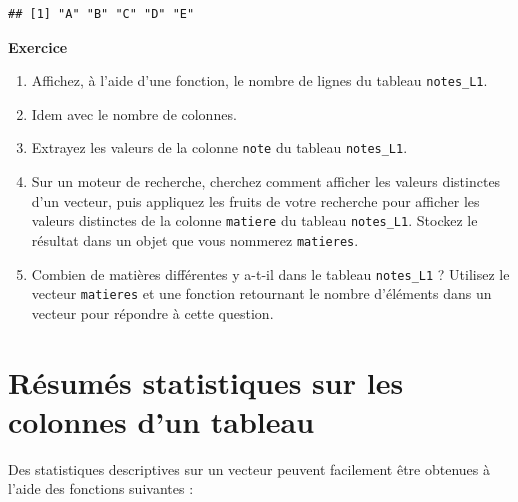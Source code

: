 \documentclass[
  11pt,
]{book}
\newcommand{\VERB}{\Verb[commandchars=\\\{\}]}
\newcommand{\FunctionTok}[1]{\textcolor[rgb]{0.00,0.00,0.00}{#1}}
\newcommand{\NormalTok}[1]{#1}
\providecommand{\tightlist}{%
  \setlength{\itemsep}{0pt}\setlength{\parskip}{0pt}}
\numberwithin{equation}{section}
\numberwithin{countremarque}{section}
\newenvironment{greenbox}{
  \begin{tcolorbox}[breakable, colback=vert,coltext=black,
                  colframe=grisfonce]}
 {\end{tcolorbox}}
\begin{document}
\begin{lstlisting}
## [1] "A" "B" "C" "D" "E"
\end{lstlisting}

\begin{greenbox}

\textbf{Exercice}

\begin{enumerate}
\def\labelenumi{\arabic{enumi}.}
\tightlist
\item
  Affichez, à l'aide d'une fonction, le nombre de lignes du tableau \texttt{notes\_L1}.
\item
  Idem avec le nombre de colonnes.
\item
  Extrayez les valeurs de la colonne \texttt{note} du tableau \texttt{notes\_L1}.
\item
  Sur un moteur de recherche, cherchez comment afficher les valeurs distinctes d'un vecteur, puis appliquez les fruits de votre recherche pour afficher les valeurs distinctes de la colonne \texttt{matiere} du tableau \texttt{notes\_L1}. Stockez le résultat dans un objet que vous nommerez \texttt{matieres}.
\item
  Combien de matières différentes y a-t-il dans le tableau \texttt{notes\_L1} ? Utilisez le vecteur \texttt{matieres} et une fonction retournant le nombre d'éléments dans un vecteur pour répondre à cette question.
\end{enumerate}

\end{greenbox}

\hypertarget{ruxe9sumuxe9s-statistiques-sur-les-colonnes-dun-tableau}{%
\section{Résumés statistiques sur les colonnes d'un tableau}\label{ruxe9sumuxe9s-statistiques-sur-les-colonnes-dun-tableau}}

Des statistiques descriptives sur un vecteur peuvent facilement être obtenues à l'aide des fonctions suivantes :

\end{document}
